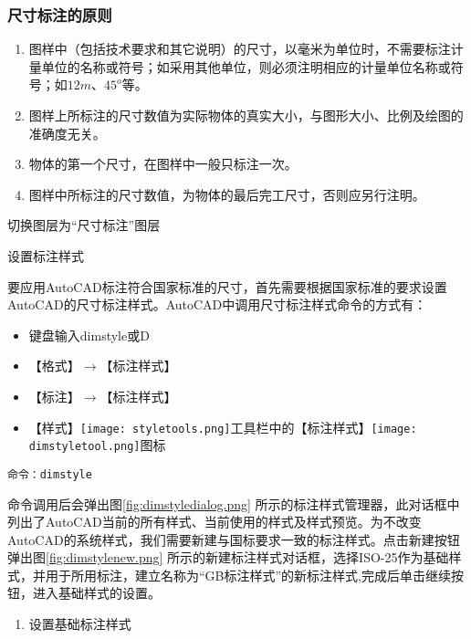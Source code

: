 \subsubsection{尺寸标注的原则}
\begin{enumerate}
\item 图样中（包括技术要求和其它说明）的尺寸，以毫米为单位时，不需要标注计量单位的名称或符号；如采用其他单位，则必须注明相应的计量单位名称或符号；如$12m$、$45^o$等。
\item 图样上所标注的尺寸数值为实际物体的真实大小，与图形大小、比例及绘图的准确度无关。
\item 物体的第一个尺寸，在图样中一般只标注一次。
\item 图样中所标注的尺寸数值，为物体的最后完工尺寸，否则应另行注明。
\end{enumerate}
\begin{procedure}
\item 切换图层为“尺寸标注”图层
\item 设置标注样式

要应用AutoCAD标注符合国家标准的尺寸，首先需要根据国家标准的要求设置AutoCAD的尺寸标注样式。AutoCAD中调用尺寸标注样式命令的方式有：
\begin{itemize}
\item 键盘输入dimstyle或D
\item 【格式】$\rightarrow$【标注样式】
\item 【标注】$\rightarrow$【标注样式】
\item 【样式】\texttt{[image: styletools.png]}工具栏中的【标注样式】\texttt{[image: dimstyletool.png]}图标
\end{itemize}

\begin{lstlisting}
命令：dimstyle
\end{lstlisting}
命令调用后会弹出图\ref{fig:dimstyledialog.png} 所示的标注样式管理器，此对话框中列出了AutoCAD当前的所有样式、当前使用的样式及样式预览。为不改变AutoCAD的系统样式，我们需要新建与国标要求一致的标注样式。点击新建按钮弹出图\ref{fig:dimstylenew.png} 所示的新建标注样式对话框，选择ISO-25作为基础样式，并用于所用标注，建立名称为“GB标注样式”的新标注样式,完成后单击继续按钮，进入基础样式的设置。
\begin{figure}[htbp]
\centering
\begin{floatrow}[2]
\end{floatrow}
\end{figure}
\begin{enumerate}
\item 设置基础标注样式


\end{enumerate}
\end{procedure}
